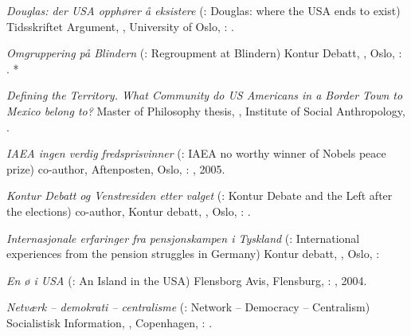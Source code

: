 \begin{itemize}
{%

\item \textit{Douglas: der USA opphører å eksistere} (\english: Douglas: where the USA ends to exist) Tidsskriftet Argument, , University of Oslo, \Norway: .

\item \textit{Omgruppering på Blindern} (\english: Regroupment at Blindern) Kontur Debatt, , Oslo, \Norway: . *
\item \textit{Defining the Territory. What Community do US Americans in a Border Town to Mexico belong to?} Master of Philosophy thesis, , Institute of Social Anthropology, \uio.
\item \textit{IAEA ingen verdig fredsprisvinner} (\english: IAEA no worthy winner of Nobels peace prize) co-author, Aftenposten, Oslo, \Norway: , 2005.
\item \textit{Kontur Debatt og Venstresiden etter valget} (\english: Kontur Debate and the Left after the elections) co-author, Kontur debatt, , Oslo, \Norway: .
\item \textit{Internasjonale erfaringer fra pensjonskampen i Tyskland} (\english: International experiences from the pension struggles in Germany) Kontur debatt, , Oslo, \Norway: 
\item \textit{En ø i USA} (\english: An Island in the USA) Flensborg Avis, Flensburg, \Germany: , 2004.

\item \textit{Netværk – demokrati – centralisme} (\english: Network -- Democracy -- Centralism) Socialistisk Information, , Copenhagen, \Denmark: .

}

\end{itemize}


